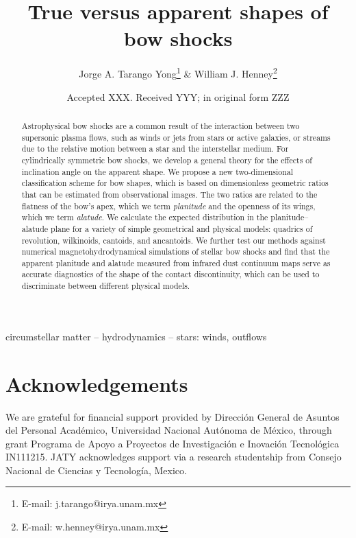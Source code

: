\documentclass[useAMS, usenatbib, a4paper]{mnras}
\title[Bow shock shapes]{True versus apparent shapes of bow shocks}
\author[Tarango Yong \& Henney]{
  Jorge A. Tarango Yong\thanks{E-mail: j.tarango@irya.unam.mx}
  \& William J. Henney\thanks{E-mail: w.henney@irya.unam.mx}\\
  \AddressCRyA
}
\date{Accepted XXX. Received YYY; in original form ZZZ}
\begin{document}
\label{firstpage}
\pagerange{\pageref{firstpage}--\pageref{lastpage}}
\maketitle
\begin{abstract}
  Astrophysical bow shocks are a common result of the interaction
  between two supersonic plasma flows, such as winds or jets from
  stars or active galaxies, or streams due to the relative motion
  between a star and the interstellar medium.
  For cylindrically symmetric bow shocks, we develop a general theory
  for the effects of inclination angle on the apparent shape. We
  propose a new two-dimensional classification scheme for bow shapes,
  which is based on dimensionless geometric ratios that can be
  estimated from observational images.  The two ratios are related to
  the flatness of the bow's apex, which we term \textit{planitude} and
  the openness of its wings, which we term \textit{alatude}.  We
  calculate the expected distribution in the planitude--alatude plane
  for a variety of simple geometrical and physical models: quadrics of
  revolution, wilkinoids, cantoids, and ancantoids.  We further test
  our methods against numerical magnetohydrodynamical simulations of
  stellar bow shocks and find that the apparent planitude and alatude
  measured from infrared dust continuum maps serve as accurate
  diagnostics of the shape of the contact discontinuity, which can be
  used to discriminate between different physical models.
\end{abstract}

\begin{keywords}
  circumstellar matter -- hydrodynamics -- stars: winds, outflows
\end{keywords}


% 



% 
% 


\section*{Acknowledgements}

We are grateful for financial support provided by Dirección General de
Asuntos del Personal Académico, Universidad Nacional Autónoma de
México, through grant Programa de Apoyo a Proyectos de Investigación e
Inovación Tecnológica IN111215.  JATY acknowledges support via a
research studentship from Consejo Nacional de Ciencias y Tecnología,
Mexico.



\appendix

%

% 

\bsp	%
\label{lastpage}
\end{document}

